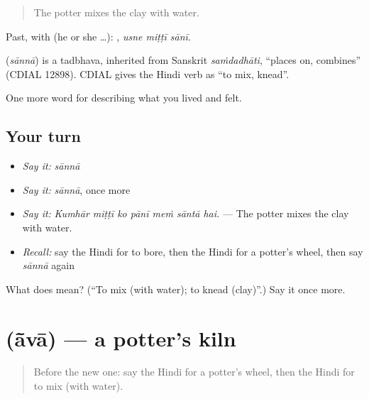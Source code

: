 \begin{quote}
The potter mixes the clay with water.
\end{quote}

Past, with  (he or she …):   , \emph{usne miṭṭī sānī}.

\begin{cousinweb}
\textbf{} (\emph{sānnā}) is a tadbhava, inherited from Sanskrit \emph{saṁdadhāti}, \textquotedblleft{}places on, combines\textquotedblright{} (CDIAL 12898). CDIAL gives the Hindi verb as \textquotedblleft{}to mix, knead\textquotedblright{}.
\end{cousinweb}

\begin{grammarlens}[title={What you've built}]
One more word for describing what you lived and felt.
\end{grammarlens}

\subsection*{Your turn}
\begin{itemize}
\raggedright
  \item \emph{Say it:} \emph{sānnā}
  \item \emph{Say it:} \emph{sānnā}, once more
  \item \emph{Say it:} \emph{Kumhār miṭṭī ko pānī meṁ sāntā hai.} — The potter mixes the clay with water.
  \item \emph{Recall:} say the Hindi for to bore, then the Hindi for a potter's wheel, then say \emph{sānnā} again
\end{itemize}

\begin{tcolorbox}[breakable,colback=teal!4,colframe=teal!35!black,title={Before you move on}]
What does  mean? (\textquotedblleft{}To mix (with water); to knead (clay)\textquotedblright{}.) Say it once more.
\end{tcolorbox}
\section[\texorpdfstring{\hi{आँवा} (ā̃vā)}{आँवा (ā̃vā)}]{ (ā̃vā) — a potter's kiln}

\label{lesson:HI-C511-ava}



\begin{quote}
Before the new one: say the Hindi for a potter's wheel, then the Hindi for to mix (with water).
\end{quote}

